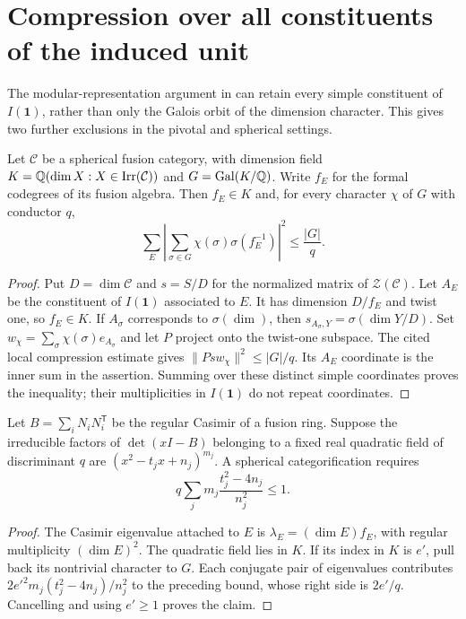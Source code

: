 \section{Compression over all constituents of the induced unit}
\label{sec:full-I1-compression}

The modular-representation argument in
\cite[Lemma~4.1 and the proof of Theorem~5.1]{SchDimensionBlock}
can retain every simple constituent of $I(\mathbf1)$, rather than only
the Galois orbit of the dimension character.  This gives two further
exclusions in the pivotal and spherical settings.

\begin{proposition}\label{prop:full-I1-bound}
Let $\mathcal C$ be a spherical fusion category, with dimension field
$K=\mathbb Q(\dim X:X\in\operatorname{Irr}(\mathcal C))$ and
$G=\operatorname{Gal}(K/\mathbb Q)$.  Write $f_E$ for the formal codegrees
of its fusion algebra.  Then $f_E\in K$ and, for every character
$\chi$ of $G$ with conductor $q$,
\[
 \sum_E\left|\sum_{\sigma\in G}
       \chi(\sigma)\sigma(f_E^{-1})\right|^2\leq\frac{|G|}{q}.
\]
\end{proposition}
\begin{proof}
Put $D=\dim\mathcal C$ and $s=S/D$ for the normalized matrix of
$\mathcal Z(\mathcal C)$.  Let $A_E$ be the constituent of
$I(\mathbf1)$ associated to $E$.  It has dimension $D/f_E$ and
twist one, so $f_E\in K$.  If $A_\sigma$ corresponds to
$\sigma(\dim)$, then
$s_{A_\sigma,Y}=\sigma(\dim Y/D)$.
Set $w_\chi=\sum_\sigma\chi(\sigma)e_{A_\sigma}$ and let $P$
project onto the twist-one subspace.  The cited local compression
estimate gives $\|Ps w_\chi\|^2\leq |G|/q$.
Its $A_E$ coordinate is the inner sum in the assertion.  Summing
over these distinct simple coordinates proves the inequality;
their multiplicities in $I(\mathbf1)$ do not repeat coordinates.
\end{proof}

\begin{corollary}\label{cor:r8-quadratic-Casimir}
Let $B=\sum_iN_iN_i^{\mathsf T}$ be the regular Casimir of a fusion
ring.  Suppose the irreducible factors of $\det(xI-B)$ belonging
to a fixed real quadratic field of discriminant $q$ are
$(x^2-t_jx+n_j)^{m_j}$.  A spherical categorification requires
\[
 q\sum_jm_j\frac{t_j^2-4n_j}{n_j^2}\leq1.
\]
\end{corollary}
\begin{proof}
The Casimir eigenvalue attached to $E$ is $\lambda_E=(\dim E)f_E$,
with regular multiplicity $(\dim E)^2$.  The quadratic field lies
in $K$.  If its index in $K$ is $e'$, pull back its nontrivial
character to $G$.  Each conjugate pair of eigenvalues contributes
$2e'^2m_j(t_j^2-4n_j)/n_j^2$ to the preceding bound, whose right
side is $2e'/q$.  Cancelling and using $e'\geq1$ proves the claim.
\end{proof}

